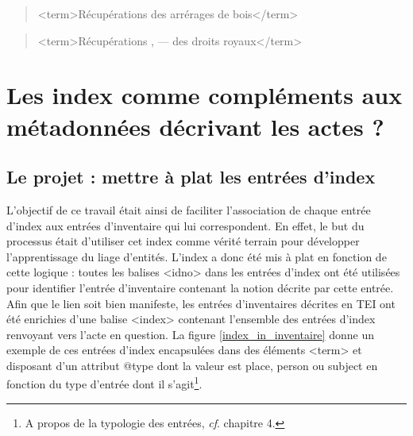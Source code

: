 \documentclass[a4paper,12pt,twoside]{book}
\begin{document}
	\begin{quotation}
		<term>Récupérations des arrérages de bois</term>
	\end{quotation}

	\begin{quotation}
		<term>Récupérations , — des droits royaux</term>
	\end{quotation}

	\section{Les index comme compléments aux métadonnées décrivant les actes ?}

	\subsection{Le projet : mettre à plat les entrées d’index}
	
	L'objectif de ce travail était ainsi de faciliter l'association de chaque entrée d'index aux entrées d'inventaire qui lui correspondent. En effet, le but du processus était d'utiliser cet index comme vérité terrain pour développer l'apprentissage du liage d'entités. L'index a donc été mis à plat en fonction de cette logique : toutes les balises <idno> dans les entrées d'index ont été utilisées pour identifier l'entrée d'inventaire contenant la notion décrite par cette entrée. Afin que le lien soit bien manifeste, les entrées d'inventaires décrites en TEI ont été enrichies d'une balise <index> contenant l'ensemble des entrées d'index renvoyant vers l'acte en question. La figure \ref{index_in_inventaire} donne un exemple de ces entrées d'index encapsulées dans des éléments <term> et disposant d'un attribut @type dont la valeur est \og place\fg{}, \og person\fg{} ou \og subject\fg{} en fonction du type d'entrée dont il s'agit\footnote{A propos de la typologie des entrées, \textit{cf}. chapitre 4.}.
	
\end{document}
